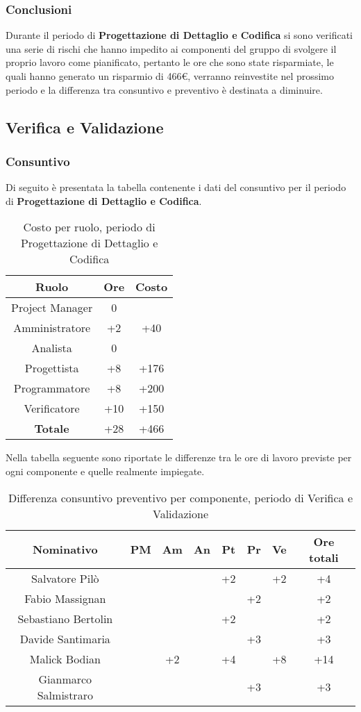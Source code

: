 		\subsubsection{Conclusioni}
		Durante il periodo di \textbf{Progettazione di Dettaglio e Codifica} si sono verificati una serie di rischi che hanno impedito ai componenti del gruppo di svolgere il proprio lavoro come pianificato, pertanto le ore che sono state risparmiate, le quali hanno generato un risparmio di 466€, verranno reinvestite nel prossimo periodo e la differenza tra consuntivo e preventivo è destinata a diminuire.
	\subsection{Verifica e Validazione}
	\subsubsection{Consuntivo}
		Di seguito è presentata la tabella contenente i dati del consuntivo per il periodo di \textbf{Progettazione di Dettaglio e Codifica}.
	\begin{table}[H]
		\centering
		\begin{tabular}{|c|c|c|}
			\hline
			\textbf{Ruolo}		& \textbf{Ore}	& \textbf{Costo} \\
			\hline
			Project Manager		& 0			&	\\
			Amministratore		& +2		& +40	\\
			Analista			& 0			&  \\
			Progettista			& +8		& +176	\\
			Programmatore		& +8		& +200	\\
			Verificatore		& +10		& +150	\\
			\hline
			\textbf{Totale}		& +28		& +466	\\
			\hline
		\end{tabular}
		\caption{Costo per ruolo, periodo di Progettazione di Dettaglio e Codifica}
	\end{table}
	Nella tabella seguente sono riportate le differenze tra le ore di lavoro previste per ogni componente e quelle realmente impiegate.
	\begin{table}[H]
		\centering
		\begin{tabular}{|c|c|c|c|c|c|c|c|}
			\hline
			\textbf{Nominativo}		& \textbf{PM}	& \textbf{Am}	& \textbf{An}	& \textbf{Pt}	& \textbf{Pr}	& \textbf{Ve}	& \textbf{Ore totali}     \\
			\hline
			Salvatore Pilò			& 		& 		& 		& +2	&		& +2	& +4 \\
			Fabio Massignan			& 		& 		&		&		& +2	& 		& +2 \\
			Sebastiano Bertolin		&		& 	 	& 		& +2	& 		&		& +2 \\
			Davide Santimaria		&		& 		&		&		& +3	& 		& +3 \\
			Malick Bodian			& 		& +2	& 		& +4	&		& +8	& +14 \\
			Gianmarco Salmistraro	&		&		& 	 	&		& +3	& 		& +3 \\
			\hline
		\end{tabular}
		\caption{Differenza consuntivo preventivo per componente, periodo di Verifica e Validazione}
	\end{table}
